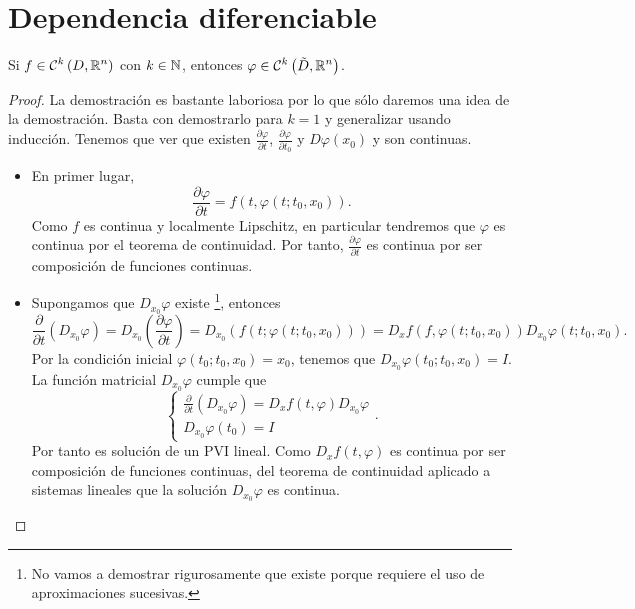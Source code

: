 \section{Dependencia diferenciable}
\begin{theorem}
	Si $\displaystyle f \in \mathcal{C}^{k}\left(D, \mathbb{R}^{n}\right) $ con $\displaystyle k \in \mathbb{N} $, entonces $\displaystyle \varphi \in \mathcal{C}^{k}\left(\tilde{D}, \mathbb{R}^{n}\right) $. 
\end{theorem}
\begin{proof}
La demostración es bastante laboriosa por lo que sólo daremos una idea de la demostración. Basta con demostrarlo para $\displaystyle k = 1 $ y generalizar usando inducción. Tenemos que ver que existen $\displaystyle \frac{\partial \varphi}{\partial t} $, $\displaystyle \frac{\partial \varphi}{\partial t_{0}} $ y $\displaystyle D\varphi\left(x_{0}\right) $ y son continuas. 
\begin{itemize}
\item En primer lugar, 
\[
\frac{\partial \varphi}{\partial t}=f\left(t, \varphi\left(t; t_{0}, x_{0}\right)\right) .
\]
Como $\displaystyle f $ es continua y localmente Lipschitz, en particular tendremos que $\displaystyle \varphi $ es continua por el teorema de continuidad. Por tanto, $\displaystyle \frac{\partial \varphi}{\partial t} $ es continua por ser composición de funciones continuas.
\item Supongamos que $\displaystyle D_{x_{0}}\varphi $ existe \footnote{No vamos a demostrar rigurosamente que existe porque requiere el uso de aproximaciones sucesivas.}, entonces
\[\frac{\partial }{\partial t}\left(D_{x_{0}}\varphi\right)=D_{x_{0}}\left(\frac{\partial \varphi}{\partial t}\right)=D_{x_{0}}\left(f\left(t; \varphi\left(t; t_{0}, x_{0}\right)\right)\right) = D_{x}f\left(f, \varphi\left(t; t_{0}, x_{0}\right)\right)D_{x_{0}}\varphi\left(t; t_{0}, x_{0}\right) .\]
Por la condición inicial $\displaystyle \varphi\left(t_{0}; t_{0}, x_{0}\right)=x_{0} $, tenemos que $\displaystyle D_{x_{0}}\varphi\left(t_{0}; t_{0}, x_{0}\right)=I $. La función matricial $\displaystyle D_{x_{0}}\varphi $ cumple que 
\[
\begin{cases}
\frac{\partial }{\partial t}\left(D_{x_{0}}\varphi\right)=D_{x}f\left(t, \varphi\right)D_{x_{0}}\varphi \\
D_{x_{0}}\varphi\left(t_{0}\right)= I
\end{cases}
.\]
Por tanto es solución de un PVI lineal. Como $\displaystyle D_{x}f\left(t, \varphi\right) $ es continua por ser composición de funciones continuas, del teorema de continuidad aplicado a sistemas lineales que la solución $\displaystyle D_{x_{0}}\varphi $ es continua.

\end{itemize}
\end{proof}
